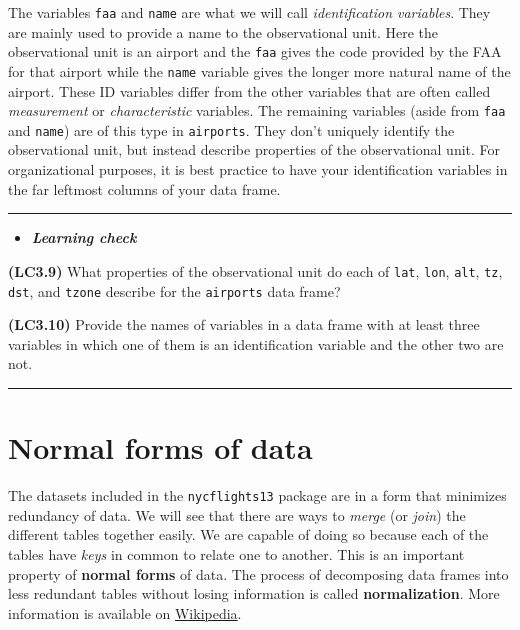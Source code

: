 \documentclass[]{tufte-book}
\let\oldrule=\rule
\renewcommand{\rule}[1]{\oldrule{\linewidth}}
\newenvironment{rmdblock}[1]
  {\begin{shaded*}
  \begin{itemize}
  \renewcommand{\labelitemi}{
    \raisebox{-.7\height}[0pt][0pt]{
    }
  }
  \item
  }
  {
  \end{itemize}
  \end{shaded*}
  }
\newenvironment{learncheck}
  {\begin{rmdblock}{warning}}
  {\end{rmdblock}}
\begin{document}
The variables \texttt{faa} and \texttt{name} are what we will call
\emph{identification variables}. They are mainly used to provide a name
to the observational unit. Here the observational unit is an airport and
the \texttt{faa} gives the code provided by the FAA for that airport
while the \texttt{name} variable gives the longer more natural name of
the airport. These ID variables differ from the other variables that are
often called \emph{measurement} or \emph{characteristic} variables. The
remaining variables (aside from \texttt{faa} and \texttt{name}) are of
this type in \texttt{airports}. They don't uniquely identify the
observational unit, but instead describe properties of the observational
unit. For organizational purposes, it is best practice to have your
identification variables in the far leftmost columns of your data frame.

\begin{center}\rule{0.5\linewidth}{\linethickness}\end{center}

\begin{learncheck}
\textbf{\emph{Learning check}}
\end{learncheck}

\textbf{(LC3.9)} What properties of the observational unit do each of
\texttt{lat}, \texttt{lon}, \texttt{alt}, \texttt{tz}, \texttt{dst}, and
\texttt{tzone} describe for the \texttt{airports} data frame?

\textbf{(LC3.10)} Provide the names of variables in a data frame with at
least three variables in which one of them is an identification variable
and the other two are not.

\begin{center}\rule{0.5\linewidth}{\linethickness}\end{center}

\section{Normal forms of data}\label{normal-forms-of-data}

The datasets included in the \texttt{nycflights13} package are in a form
that minimizes redundancy of data. We will see that there are ways to
\emph{merge} (or \emph{join}) the different tables together easily. We
are capable of doing so because each of the tables have \emph{keys} in
common to relate one to another. This is an important property of
\textbf{normal forms} of data. The process of decomposing data frames
into less redundant tables without losing information is called
\textbf{normalization}. More information is available on
\href{https://en.wikipedia.org/wiki/Database_normalization}{Wikipedia}.
\end{document}
